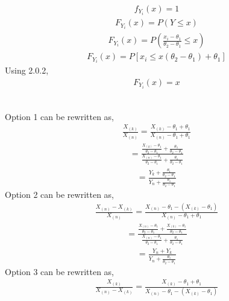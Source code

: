 \documentclass[journal,12pt,twocolumn]{IEEEtran}
\begin{document}
\begin{align}
     f_{Y_{i}}(x) = 1
\end{align}
\begin{align}
     F_{Y_{i}}(x) = P(Y\leq x)
\end{align}
\begin{align}
     F_{Y_{i}}(x) = P\left(\frac{x_{i}-\theta_{1}}{\theta_{2}-\theta_{1}}\leq x\right)
\end{align}
\begin{align}
     F_{Y_{i}}(x) = P\left[x_{i}\leq x(\theta_{2}-\theta_{1})+\theta_{1}\right]
\end{align}
Using 2.0.2,
\begin{align}
     F_{Y_{i}}(x) = x
\end{align}

\\
Option 1 can be rewritten as, 
\begin{align}
    \frac{X_{(k)}}{X_{(n)}} =\frac{X_{(k)}-\theta_{1}+\theta_{1}}{X_{(n)}-\theta_{1}+\theta_{1}}
\end{align}
\begin{align}
    =\frac{\frac{X_{(k)}-\theta_{1}}{\theta_{2}-\theta_{1}}+\frac{\theta_{1}}{\theta_{2}-\theta_{1}}}{\frac{X_{(n)}-\theta_{1}}{\theta_{2}-\theta_{1}}+\frac{\theta_{1}}{\theta_{2}-\theta_{1}}}
\end{align}
\begin{align}
    =\frac{Y_{k}+\frac{\theta_{1}}{\theta_{2}-\theta_{1}}}{Y_{n}+\frac{\theta_{1}}{\theta_{2}-\theta_{1}}}
\end{align}
Option 2 can be rewritten as, 
\begin{align}
    \frac{X_{(n)}-X_{(k)}}{X_{(n)}} 
    =\frac{X_{(n)}-\theta_{1}-(X_{(k)}-\theta_{1})}{X_{(n)}-\theta_{1}+\theta_{1}}
\end{align}
\begin{align}
    =\frac{\frac{X_{(n)}-\theta_{1}}{\theta_{2}-\theta_{1}}+\frac{X_{(k)}-\theta_{1}}{\theta_{2}-\theta_{1}}}{\frac{X_{(n)}-\theta_{1}}{\theta_{2}-\theta_{1}}+\frac{\theta_{1}}{\theta_{2}-\theta_{1}}}
\end{align}
\begin{align}
    =\frac{Y_{n}+Y_{k}}{Y_{n}+\frac{\theta_{1}}{\theta_{2}-\theta_{1}}}
\end{align}
Option 3 can be rewritten as, 
\begin{align}
    \frac{X_{(k)}}{X_{(n)}-X_{(k)}} 
    =\frac{X_{(k)}-\theta_{1}+\theta_{1}}{X_{(n)}-\theta_{1}-(X_{(k)}-\theta_{1})}
\end{align}
\end{document}
